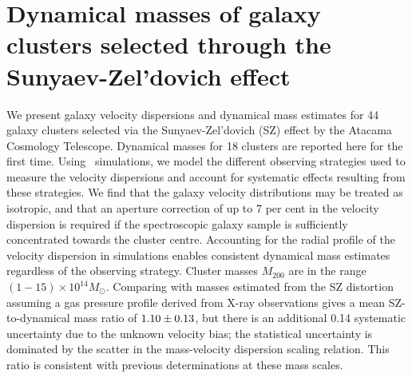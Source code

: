 % 
% 
% 

\chapter{Dynamical masses of galaxy clusters selected through the Sunyaev-Zel'dovich effect}
\label{chapter:act}

\begin{small}
We present galaxy velocity dispersions and dynamical mass estimates for 44 galaxy clusters selected via the Sunyaev-Zel'dovich (SZ) effect by the Atacama Cosmology Telescope. Dynamical masses for 18 clusters are reported here for the first time. Using \Nbody\ simulations, we model the different observing strategies used to measure the velocity dispersions and account for systematic effects resulting from these strategies. We find that the galaxy velocity distributions may be treated as isotropic, and that an aperture correction of up to 7 per cent in the velocity dispersion is required if the spectroscopic galaxy sample is sufficiently concentrated towards the cluster centre. Accounting for the radial profile of the velocity dispersion in simulations enables consistent dynamical mass estimates regardless of the observing strategy. Cluster masses $M_{200}$ are in the range $(1-15)\times10^{14}M_\odot$. Comparing with masses estimated from the SZ distortion assuming a gas pressure profile derived from X-ray observations gives a mean SZ-to-dynamical mass ratio of $1.10\pm0.13$, but there is an additional 0.14 systematic uncertainty due to the unknown velocity bias; the statistical uncertainty is dominated by the scatter in the mass-velocity dispersion scaling relation. This ratio is consistent with previous determinations at these mass scales.
\end{small}

